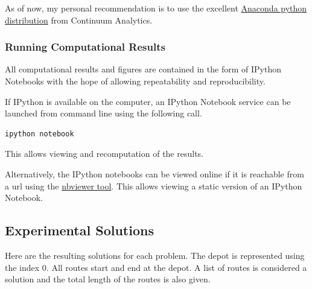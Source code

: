 \documentclass{article} %
\begin{document}
As of now, my personal recommendation is to use the excellent \href{http://continuum.io/downloads}{Anaconda python distribution} from Continuum Analytics.


\subsubsection{Running Computational Results}

All computational results and figures are contained in the form of IPython Notebooks with the hope of allowing repeatability and reproducibility.


If IPython is available on the computer, an IPython Notebook service can be launched from command line using the following call.

\begin{verbatim}
ipython notebook    
\end{verbatim}

This allows viewing and recomputation of the results.\newline


Alternatively, the IPython notebooks can be viewed online if it is reachable from a url using the \href{http://nbviewer.IPython.org/}{nbviewer tool}. This allows viewing a static version of an IPython Notebook.



\newpage
\subsection{Experimental Solutions}
Here are the resulting solutions for each problem. The depot is represented using the index 0. All routes start and end at the depot. A list of routes is considered a solution and the total length of the routes is also given.
\end{document}
